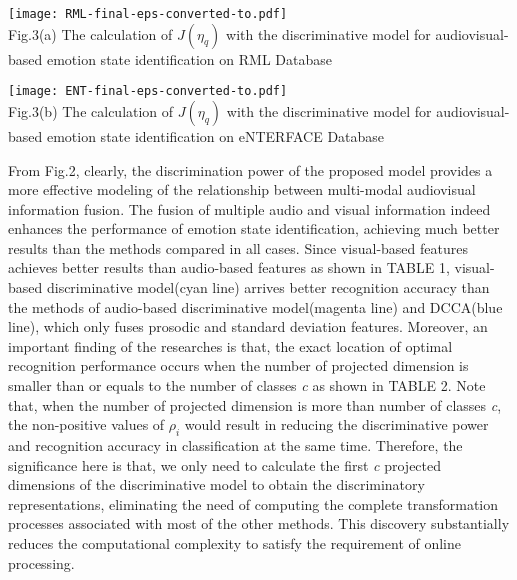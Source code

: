 \documentclass[10pt,journal,compsoc]{IEEEtran}
\begin{document}
\begin{figure*}[t]
\centering
\texttt{[image: RML-final-eps-converted-to.pdf]}\\ Fig.3(a) The calculation of $J(\eta_q)$ with the discriminative model for audiovisual-based emotion state identification on RML Database\\
\end{figure*}
\begin{figure*}[t]
\centering
\texttt{[image: ENT-final-eps-converted-to.pdf]}\\ Fig.3(b) The calculation of $J(\eta_q)$ with the discriminative model for audiovisual-based emotion state identification on eNTERFACE Database\\
\end{figure*}
From Fig.2, clearly, the discrimination power of the proposed model provides a more effective modeling of the relationship between multi-modal audiovisual information fusion. The fusion of multiple audio and visual information indeed enhances the performance of emotion state identification, achieving much better results than the methods compared in all cases. Since visual-based features achieves better results than audio-based features as shown in TABLE 1, visual-based discriminative model(cyan line) arrives better recognition accuracy than the methods of audio-based discriminative model(magenta line) and DCCA(blue line), which only fuses prosodic and standard deviation features. Moreover, an important finding of the researches is that, the exact location of optimal recognition performance occurs when the number of projected dimension is smaller than or equals to the number of classes \textit{c} as shown in TABLE 2. Note that, when the number of projected dimension is more than number of classes \textit{c}, the non-positive values of ${\rho _i}$ would result in reducing the discriminative power and recognition accuracy in classification at the same time. Therefore, the significance here is that, we only need to calculate the first \textit{c} projected dimensions of the discriminative model to obtain the discriminatory representations, eliminating the need of computing the complete transformation processes associated with most of the other methods. This discovery substantially reduces the computational complexity to satisfy the requirement of online processing.
\end{document}
